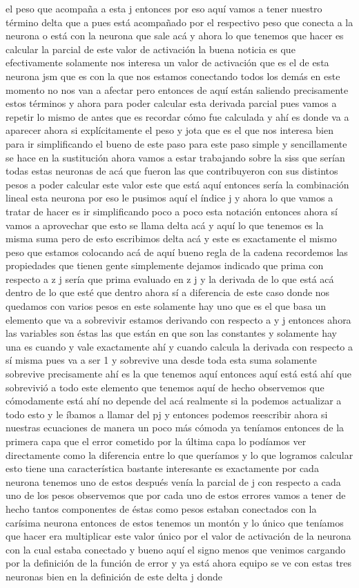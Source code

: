 el peso que acompaña a esta j entonces por eso aquí vamos a tener nuestro término delta que a pues está acompañado por el respectivo peso que conecta a la neurona o está con la neurona que sale acá y ahora lo que tenemos que hacer es calcular la parcial de este valor de activación la buena noticia es que efectivamente solamente nos interesa un valor de activación que es el de esta neurona jsm que es con la que nos estamos conectando todos los demás en este momento no nos van a afectar pero entonces de aquí están saliendo precisamente estos términos y ahora para poder calcular esta derivada parcial pues vamos a repetir lo mismo de antes que es recordar cómo fue calculada y ahí es donde va a aparecer ahora si explícitamente el peso y jota que es el que nos interesa bien para ir simplificando el bueno de este paso para este paso simple y sencillamente se hace en la sustitución ahora vamos a estar trabajando sobre la siss que serían todas estas neuronas de acá que fueron las que contribuyeron con sus distintos pesos a poder calcular este valor este que está aquí entonces sería la combinación lineal esta neurona por eso le pusimos aquí el índice j y ahora lo que vamos a tratar de hacer es ir simplificando poco a poco esta notación entonces ahora sí vamos a aprovechar que esto se llama delta acá y aquí lo que tenemos es la misma suma pero de esto escribimos delta acá y este es exactamente el mismo peso que estamos colocando acá de aquí bueno regla de la cadena recordemos las propiedades que tienen gente simplemente dejamos indicado que prima con respecto a z j sería que prima evaluado en z j y la derivada de lo que está acá dentro de lo que esté que dentro ahora sí a diferencia de este caso donde nos quedamos con varios pesos en este solamente hay uno que es el que basa un elemento que va a sobrevivir estamos derivando con respecto a y j entonces ahora las variables son éstas las que están en que son las constantes y solamente hay una es cuando y vale exactamente ahí y cuando calcula la derivada con respecto a sí misma pues va a ser 1 y sobrevive una desde toda esta suma solamente sobrevive precisamente ahí es la que tenemos aquí entonces aquí está está ahí que sobrevivió a todo este elemento que tenemos aquí de hecho observemos que cómodamente está ahí no depende del acá realmente si la podemos actualizar a todo esto y le íbamos a llamar del pj y entonces podemos reescribir ahora si nuestras ecuaciones de manera un poco más cómoda ya teníamos entonces de la primera capa que el error cometido por la última capa lo podíamos ver directamente como la diferencia entre lo que queríamos y lo que logramos calcular esto tiene una característica bastante interesante es exactamente por cada neurona tenemos uno de estos después venía la parcial de j con respecto a cada uno de los pesos observemos que por cada uno de estos errores vamos a tener de hecho tantos componentes de éstas como pesos estaban conectados con la carísima neurona entonces de estos tenemos un montón y lo único que teníamos que hacer era multiplicar este valor único por el valor de activación de la neurona con la cual estaba conectado y bueno aquí el signo menos que venimos cargando por la definición de la función de error y ya está ahora equipo se ve con estas tres neuronas bien en la definición de este delta j donde 